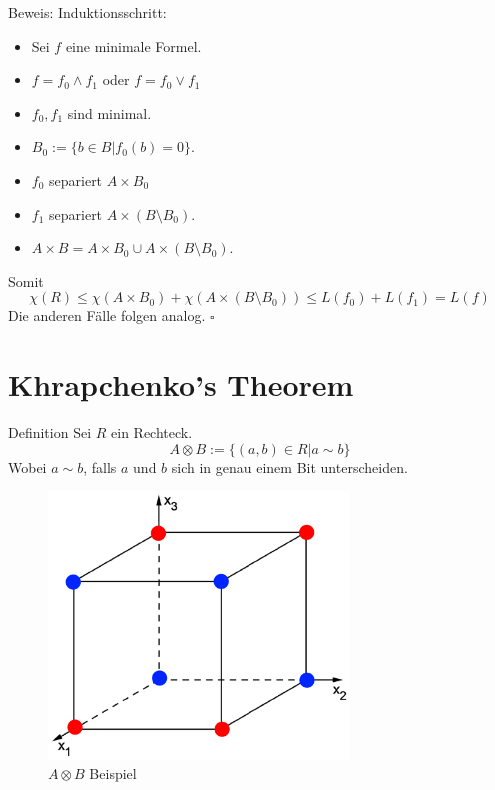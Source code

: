 \begin{frame}[t]
Beweis:
\newline
\newline
Induktionsschritt:
\begin{itemize}
    \pause
    \item Sei $f$ eine minimale Formel.
    \pause
    \item $f = f_0 \wedge f_1$ oder $f = f_0 \vee f_1$ 
    \pause
    \item $f_0, f_1$ sind minimal.
    \pause
    \item $B_0 := \{ b\in B \vert f_0(b) = 0\}$.
    \pause
    \item $f_0$ separiert $A\times B_0$
    \pause
    \item $f_1$ separiert $A\times (B\setminus B_0)$.
    \pause
    \item $A\times B = A\times B_0 \cup A\times (B\setminus B_0)$.
\end{itemize}
\pause
Somit
\[
    \chi(R) \leq \chi(A\times B_0) + \chi (A\times (B\setminus B_0)) \leq L(f_0) + L(f_1) = L(f)
\]
\pause
Die anderen Fälle folgen analog. \hfill$\square$
\end{frame}

\section{Khrapchenko's Theorem}
\begin{frame}
    \begin{block}{Definition}
        Sei $R$ ein Rechteck.
        \[
            A \otimes B := \{ (a,b) \in R \vert a \sim b\}
        \]
        Wobei $a \sim b$, falls $a$ und $b$ sich in genau einem Bit unterscheiden.
    \end{block}
\end{frame}

\begin{frame}
    \begin{figure}
        \centering
        \includegraphics[width=80mm,scale=0.5]{khrapchenkos1.png}
        \caption{$A\otimes B$ Beispiel}
    \end{figure}
\end{frame}

